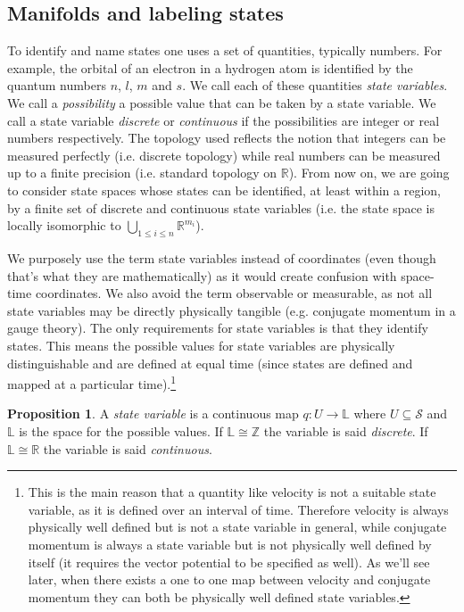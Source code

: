 \documentclass[smallextended]{svjour3}
\numberwithin{equation}{section}
\theoremstyle{definition}
\newtheorem{prop}[equation]{Proposition}
\begin{document}
\subsection{Manifolds and labeling states}

To identify and name states one uses a set of quantities, typically numbers. For example, the orbital of an electron in a hydrogen atom is identified by the quantum numbers $n$, $l$, $m$ and $s$. We call each of these quantities \emph{state variables}. We call a \emph{possibility} a possible value that can be taken by a state variable. We call a state variable \emph{discrete} or \emph{continuous} if the possibilities are integer or real numbers respectively. The topology used reflects the notion that integers can be measured perfectly (i.e. discrete topology) while real numbers can be measured up to a finite precision (i.e. standard topology on $\mathbb{R}$). From now on, we are going to consider state spaces whose states can be identified, at least within a region, by a finite set of discrete and continuous state variables (i.e. the state space is locally isomorphic to $\bigcup\limits_{1 \leq i \leq n} \mathbb{R}^{m_i}$).

We purposely use the term state variables instead of coordinates (even though that's what they are mathematically) as it would create confusion with space-time coordinates. We also avoid the term observable or measurable, as not all state variables may be directly physically tangible (e.g. conjugate momentum in a gauge theory). The only requirements for state variables is that they identify states. This means the possible values for state variables are physically distinguishable and are defined at equal time (since states are defined and mapped at a particular time).\footnote{This is the main reason that a quantity like velocity is not a suitable state variable, as it is  defined over an interval of time. Therefore velocity is always physically well defined but is not a state variable in general, while conjugate momentum is always a state variable but is not physically well defined by itself (it requires the vector potential to be specified as well). As we'll see later, when there exists a one to one map between velocity and conjugate momentum they can both be physically well defined state variables.}

\begin{prop}\label{prop:state_variable}
	A \emph{state variable} is a continuous map $q : U \rightarrow \mathbb{L}$ where $U \subseteq \mathcal{S}$ and $\mathbb{L}$ is the space for the possible values. If $\mathbb{L}\cong \mathbb{Z}$ the variable is said \emph{discrete}. If $\mathbb{L}\cong \mathbb{R}$ the variable is said \emph{continuous}.
\end{prop}
\end{document}
